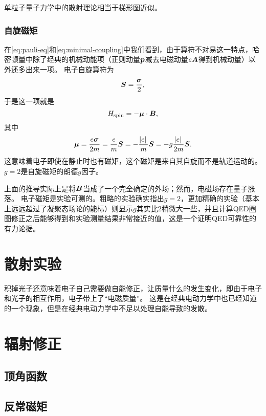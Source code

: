 \documentclass[hyperref, UTF8, a4paper]{ctexart}
\begin{document}
单粒子量子力学中的散射理论相当于梯形图近似。

\subsubsection{自旋磁矩}\label{sec:spin-magnetic-moment}

在\eqref{eq:pauli-eq}和\eqref{eq:minimal-coupling}中我们看到，由于算符不对易这一特点，哈密顿量中除了经典的机械动能项（正则动量$\vb*{p}$减去电磁动量$e \vb*{A}$得到机械动量）以外还多出来一项。
电子自旋算符为
\[
    \vb*{S} = \frac{\vb*{\sigma}}{2},
\]
于是这一项就是
\begin{equation}
    H_\text{spin} = - \vb*{\mu} \cdot \vb*{B}, 
\end{equation}
其中
\begin{equation}
    \vb*{\mu} = \frac{e \vb*{\sigma}}{2m} = \frac{e}{m} \vb*{S} = - \frac{\abs*{e}}{m} \vb*{S} = - g \frac{\abs*{e}}{2m} \vb*{S}.
\end{equation}
这意味着电子即使在静止时也有磁矩，这个磁矩是来自其自旋而不是轨道运动的。$g=2$是自旋磁矩的朗德$g$因子。

上面的推导实际上是将$\vb*{B}$当成了一个完全确定的外场；然而，电磁场存在量子涨落。
电子磁矩是实验可测的。粗略的实验确实指出$g=2$，更加精确的实验（基本上远远超过了凝聚态场论的能标）则显示$g$其实比$2$稍微大一些，并且计算QED圈图修正之后能够得到和实验测量结果非常接近的值，这是一个证明QED可靠性的有力论据。

\section{散射实验}

积掉光子还意味着电子自己需要做自能修正，让质量什么的发生变化，即由于电子和光子的相互作用，电子带上了“电磁质量”。
这是在经典电动力学中也已经知道的一个现象，但是在经典电动力学中不足以处理自能导致的发散。

\section{辐射修正}\label{sec:radiation-correction}

\subsection{顶角函数}



\subsection{反常磁矩}
\end{document}
